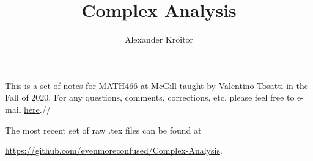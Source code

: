 \documentclass{notes}
\begin{document}
\author{Alexander Kroitor}

\begin{titlepage}
    \title{Complex Analysis}
    \maketitle
\end{titlepage}



\setcounter{lecnum}{0}
\setcounter{page}{1}
\tableofcontents

\newpage

\begin{note}
This is a set of notes for MATH466 at McGill taught by Valentino Tosatti in the Fall of 2020. For any questions, comments, corrections, etc. please feel free to e-mail \href{mailto:alexander.kroitor@mail.mcgill.ca}{here}.//
 
The most recent set of raw .tex files can be found at
\begin{center}
    \url{https://github.com/evenmoreconfused/Complex-Analysis}.
\end{center}
\end{note}












 


















\end{document}
